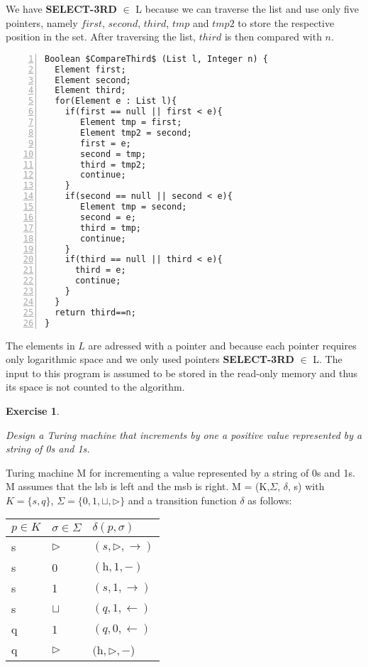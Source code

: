 \documentclass [11pt]{article}
\newtheorem{exercise}[theorem]{Exercise}
\newcommand{\blank}{\sqcup}
\newcommand{\ssym}{\triangleright}
\newcommand{\halt}{\mbox{h}}
\newcommand{\stay}{-}
\newcommand{\solution}[1]{\noindent {\bf Solution.}  #1}
\begin{document}
\solution{
We have \textbf{SELECT-3RD} $\in$ L because we can traverse the list and use only five pointers, namely $first$, $second$, $third$, $tmp$ and $tmp2$ to store the respective
position in the set. After traversing the list, $third$ is then compared with $n$.}
\begin{lstlisting}[label=haltingtodouble,caption=CompareThird,mathescape, numbers=left, numberstyle=\tiny]
Boolean $CompareThird$ (List l, Integer n) {
  Element first;
  Element second;
  Element third;
  for(Element e : List l){
    if(first == null || first < e){
       Element tmp = first;
       Element tmp2 = second;
       first = e;
       second = tmp;
       third = tmp2;
       continue;
    }
    if(second == null || second < e){
       Element tmp = second;
       second = e;
       third = tmp;
       continue;
    }
    if(third == null || third < e){
      third = e;
      continue;
    }
  }
  return third==n;
}
\end{lstlisting}
The elements in $L$ are adressed with a pointer and because each pointer requires only logarithmic space and we only used pointers \textbf{SELECT-3RD} $\in$ L. 
The input to this program is assumed to be stored in the read-only memory and thus its space is not counted to the algorithm.


\begin{exercise}
  \label{ex:turing}

  Design a Turing machine that increments by one a positive value represented by a string of 0s and 1s.

\end{exercise}

\solution{
Turing machine M for incrementing a value represented by a string of 0s and 1s. 
M assumes that the lsb is left and the msb is right.
M = (K,$\Sigma$, $\delta$, s) with $K=\{s, q\}$, $\Sigma=\{0,1,\blank, \ssym\}$ and a transition function $\delta$ as follows:\\

\begin{center}
    \begin{tabular}{| l  l | l |}
    \hline
    $p \in K$ & $\sigma \in \Sigma$ & $\delta(p,\sigma)$\\ \hline
    s         &       $ \ssym  $    &  $ (s,\ssym,\rightarrow) $               \\ \hline
    s         &        0            &  $(\halt,1,\stay)$                 \\ \hline
    s         &        1            &  $(s,1,\rightarrow)$                 \\ \hline
    s         &       $ \blank $    &  $(q,1,\leftarrow)$                 \\ \hline
    q         &        1            &  $(q,0,\leftarrow)$                 \\ \hline
    q         &        $\ssym$      &  $(\halt,\ssym,\stay$)                 \\ \hline
    \hline
    \end{tabular}
\end{center}

}
\end{document}
